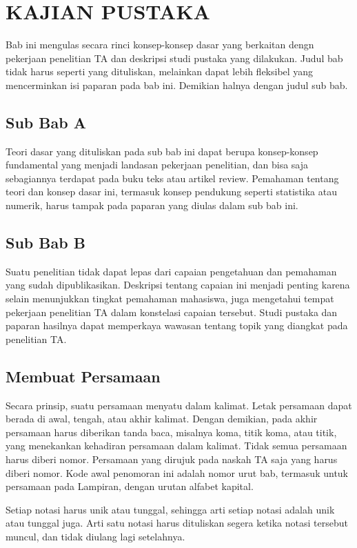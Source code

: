 \chapter{KAJIAN PUSTAKA}

\noindent Bab ini mengulas secara rinci konsep-konsep dasar yang berkaitan dengn pekerjaan penelitian TA dan deskripsi studi pustaka yang dilakukan. Judul bab tidak harus seperti yang dituliskan, melainkan dapat lebih fleksibel yang mencerminkan isi paparan pada bab ini. Demikian halnya dengan judul sub bab.

\section{Sub Bab A} 
\noindent Teori dasar yang dituliskan pada sub bab ini dapat berupa konsep-konsep fundamental yang menjadi landasan pekerjaan penelitian, dan bisa saja sebagiannya terdapat pada buku teks atau artikel review. Pemahaman tentang teori dan konsep dasar ini, termasuk konsep pendukung seperti statistika atau numerik, harus tampak pada paparan yang diulas dalam sub bab ini.

\section{Sub Bab B}
\noindent Suatu penelitian tidak dapat lepas dari capaian pengetahuan dan pemahaman yang sudah dipublikasikan. Deskripsi tentang capaian ini menjadi penting karena selain menunjukkan tingkat pemahaman mahasiswa, juga mengetahui tempat pekerjaan penelitian TA dalam konstelasi capaian tersebut. Studi pustaka dan paparan hasilnya dapat memperkaya wawasan tentang topik yang diangkat pada penelitian TA.

\section{Membuat Persamaan}
\noindent Secara prinsip, suatu persamaan menyatu dalam kalimat. Letak persamaan dapat berada di awal, tengah, atau akhir kalimat. Dengan demikian, pada akhir persamaan harus diberikan tanda baca, misalnya koma, titik koma, atau titik, yang menekankan kehadiran persamaan dalam kalimat. Tidak semua persamaan harus diberi nomor. Persamaan yang dirujuk pada naskah TA saja yang harus diberi nomor. Kode awal penomoran ini adalah nomor urut bab, termasuk untuk persamaan pada Lampiran, dengan urutan alfabet kapital.

Setiap notasi harus unik atau tunggal, sehingga arti setiap notasi adalah unik atau tunggal juga. Arti satu notasi harus dituliskan segera ketika notasi tersebut muncul, dan tidak diulang lagi setelahnya.

